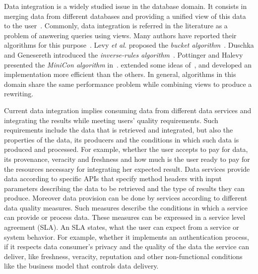 \documentclass[11pt,a4paper,oneside]{report}
\begin{document}
Data integration is a widely studied issue in the database domain. It consists in merging data from different databases and providing a unified view of this data to the user~\cite{Lenzerini:2002}. Commonly, data integration is referred in the literature as a problem of answering queries using views. Many authors have reported their algorithms for this purpose~\cite{Halevy:2001}. Levy \textit{et al.} proposed the \textit{bucket algorithm}~\cite{Levy:1996}. %
Duschka and Genesereth introduced the \textit{inverse-rules algorithm}~\cite{Duschka:1997}. %
Pottinger and Halevy presented the \textit{MiniCon algorithm} in~\cite{Pottinger:2001}. \cite{Pottinger:2001} extended some ideas of~\cite{Duschka:1997}, and developed an implementation more efficient than the others. %
In general, algorithms in this domain share the same performance problem while combining views to produce a rewriting. %

Current data integration implies consuming data from different data services and integrating the results while meeting users' quality requirements. Such requirements include the data that is retrieved and integrated, but also the properties of the data, its producers and the conditions in which such data is produced and processed. For example, whether the user accepts to pay for data, its provenance, veracity and freshness and how much is the user ready to pay for the resources necessary for integrating her expected result. Data services provide data according to specific APIs that specify method headers with input parameters describing the data to be retrieved and the type of results they can produce. Moreover data provision can be done by services according to different data quality measures. Such measures describe the conditions in which a service can provide or process data. These measures can be expressed in a service level agreement (SLA). An SLA states, what the user can expect from a service or system behavior. For example, whether it implements an authentication process, if it respects data consumer's privacy and the quality of the data the service can deliver, like freshness, veracity, reputation and other non-functional conditions like the business model that controls data delivery.
\end{document}
